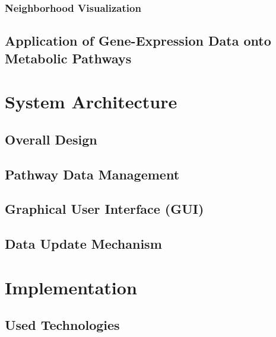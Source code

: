 \subsection{Neighborhood Visualization}

\section{Application of Gene-Expression Data onto Metabolic Pathways}


\chapter{System Architecture}

\section{Overall Design}
\section{Pathway Data Management}


\section{Graphical User Interface (GUI)}

\section{Data Update Mechanism}


\chapter{Implementation}

\section{Used Technologies}
